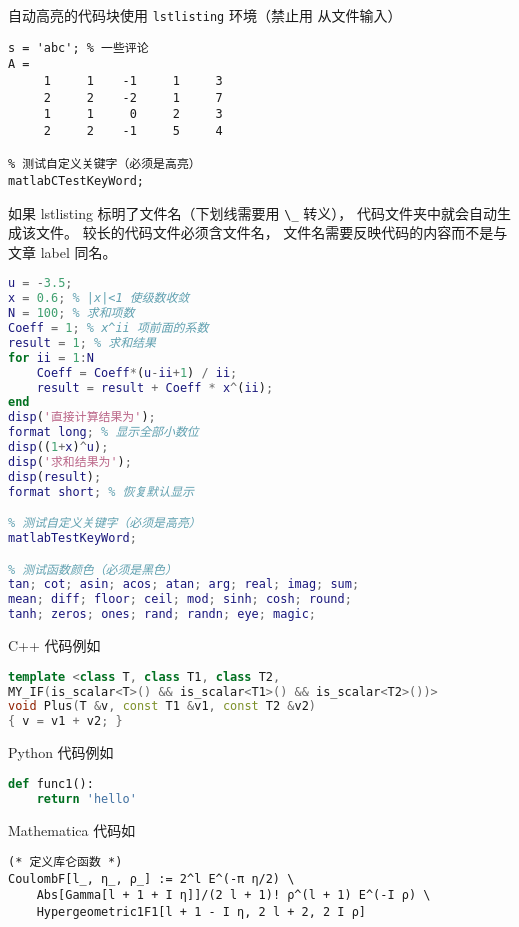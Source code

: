 自动高亮的代码块使用 \verb|lstlisting| 环境（禁止用 \verb|| 从文件输入）
\begin{lstlisting}[language=matlabC]
s = 'abc'; % 一些评论
A =
     1     1    -1     1     3
     2     2    -2     1     7
     1     1     0     2     3
     2     2    -1     5     4

% 测试自定义关键字（必须是高亮）
matlabCTestKeyWord;
\end{lstlisting}

如果 lstlisting 标明了文件名（下划线需要用 \verb|\_| 转义）， 代码文件夹中就会自动生成该文件。 较长的代码文件必须含文件名， 文件名需要反映代码的内容而不是与文章 label 同名。

\begin{lstlisting}[language=matlab, caption=sample\_code.m]
% 验证二项式定理(非整数幂)
u = -3.5;
x = 0.6; % |x|<1 使级数收敛
N = 100; % 求和项数
Coeff = 1; % x^ii 项前面的系数
result = 1; % 求和结果
for ii = 1:N
    Coeff = Coeff*(u-ii+1) / ii;
    result = result + Coeff * x^(ii);
end
disp('直接计算结果为');
format long; % 显示全部小数位
disp((1+x)^u);
disp('求和结果为');
disp(result);
format short; % 恢复默认显示

% 测试自定义关键字（必须是高亮）
matlabTestKeyWord;

% 测试函数颜色（必须是黑色）
tan; cot; asin; acos; atan; arg; real; imag; sum;
mean; diff; floor; ceil; mod; sinh; cosh; round;
tanh; zeros; ones; rand; randn; eye; magic;
\end{lstlisting}

C++ 代码例如
\begin{lstlisting}[language=cpp]
template <class T, class T1, class T2,
MY_IF(is_scalar<T>() && is_scalar<T1>() && is_scalar<T2>())>
void Plus(T &v, const T1 &v1, const T2 &v2)
{ v = v1 + v2; }
\end{lstlisting}

Python 代码例如
\begin{lstlisting}[language=python]
def func1():
	return 'hello'
\end{lstlisting}

Mathematica 代码如
\begin{lstlisting}[language=mma]
(* 定义库仑函数 *)
CoulombF[l_, η_, ρ_] := 2^l E^(-π η/2) \
    Abs[Gamma[l + 1 + I η]]/(2 l + 1)! ρ^(l + 1) E^(-I ρ) \
    Hypergeometric1F1[l + 1 - I η, 2 l + 2, 2 I ρ]
\end{lstlisting}

